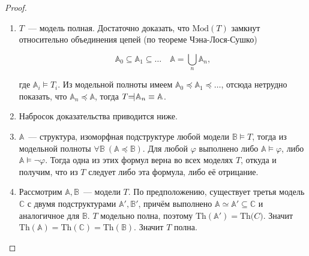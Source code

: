 \begin{proof} \

    \begin{enumerate}
        \item $T$~— модель полная. Достаточно доказать, что $\text{Mod}(T)$ замкнут относительно объединения цепей (по теореме Чэна-Лося-Сушко)
         
        \[ 
            \mathbb{A}_0 \subseteq \mathbb{A}_1 \subseteq \ldots \quad \mathbb{A} = \bigcup_n \mathbb{A}_n,
        \]

        где $\mathbb{A}_i \models T_i$.
        Из модельной полноты имеем $\mathbb{A}_0 \preceq \mathbb{A}_1 \preceq \ldots$, отсюда нетрудно показать, что $\mathbb{A}_n \preceq \mathbb{A}$, тогда $T \text{\rotatebox[origin=c]{180}{$\models$}} \mathbb{A}_n \equiv \mathbb{A}$. 
        
        \item %
            Набросок доказательства приводится ниже.

        \item $\mathbb{A}$~— структура, изоморфная подструктуре любой модели $\mathbb{B} \models T$, тогда из модельной полноты $\forall \mathbb{B}~(\mathbb{A} \preceq \mathbb{B})$. Для любой $\varphi$ выполнено либо $\mathbb{A} \models \varphi$, либо $\mathbb{A} \models \neg \varphi$. Тогда одна из этих формул верна во всех моделях $T$, откуда и получим, что из $T$ следует либо эта формула, либо её отрицание. 

        \item Рассмотрим $\mathbb{A}, \mathbb{B}$~— модели $T$. По предположению, существует третья модель $\mathbb{C}$ с двумя подструктурами $\mathbb{A}', \mathbb{B}'$, причём выполнено $\mathbb{A}\simeq\mathbb{A}'\subseteq\mathbb{C}$ и аналогичное для $\mathbb{B}$. $T$ модельно полна, поэтому $\text{Th}(\mathbb{A}')=\text{Th}{\mathbb(C)}$. Значит $\text{Th}(\mathbb{A})=\text{Th}(\mathbb{C})=\text{Th}(\mathbb{B})$. Значит $T$ полна.
    \end{enumerate}
\end{proof}
